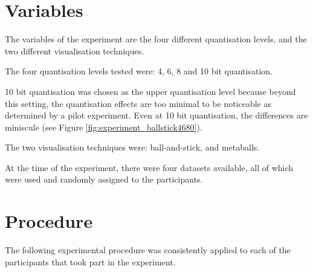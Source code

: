 
\section{Variables}
\label{sec:experiment_variables}

The variables of the experiment are the four different quantisation levels, and
the two different visualisation techniques.

The four quantisation levels tested were: 4, 6, 8 and 10 bit quantisation.

10 bit quantisation was chosen as the upper quantisation level because beyond
this setting, the quantisation effects are too minimal to be noticeable as
determined by a pilot experiment. Even at 10 bit quantisation, the differences
are miniscule (see Figure \ref{fig:experiment_ballstick4680}).

The two visualisation techniques were: ball-and-stick, and metaballs.

At the time of the experiment, there were four datasets available, all of which
were used and randomly assigned to the participants.


\section{Procedure}
\label{sec:experiment_procedure}

The following experimental procedure was consistently applied to each of the
participants that took part in the experiment.

